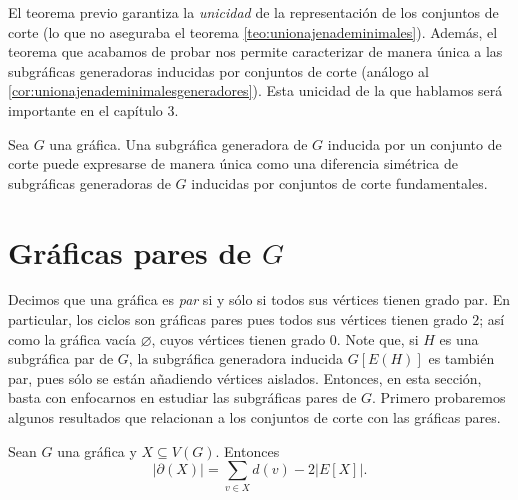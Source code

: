 El teorema previo garantiza la \textit{unicidad} de la representación de los conjuntos de corte (lo que no aseguraba el teorema \ref{teo:unionajenademinimales}). Además, el teorema que acabamos de probar nos permite caracterizar de manera única a las subgráficas generadoras inducidas por conjuntos de corte (análogo al \ref{cor:unionajenademinimalesgeneradores}). Esta unicidad de la que hablamos será importante en el capítulo 3.
\vspace{1 cm}
\begin{cor}\label{cor:DifSimUnicaDeFundamentales}
Sea $G$ una gráfica. Una subgráfica generadora de $G$ inducida por un conjunto de corte puede expresarse de manera única como una diferencia simétrica de subgráficas generadoras de $G$ inducidas por conjuntos de corte fundamentales.
\end{cor}






\section{Gráficas pares de $G$}
Decimos que una gráfica es \textit{par}  si y sólo si todos sus vértices tienen grado par. En particular, los ciclos son gráficas pares pues todos sus vértices tienen grado $2$; así como la gráfica vacía $\varnothing$, cuyos vértices tienen grado $0$. Note que, si $H$ es una subgráfica par de $G$, la subgráfica generadora inducida $G[E(H)]$ es también par, pues sólo se están añadiendo vértices aislados. Entonces, en esta sección, basta con enfocarnos en estudiar las subgráficas pares de $G$. Primero probaremos algunos resultados que relacionan a los conjuntos de corte con las gráficas pares.  

\begin{lema} \label{lema1}
Sean $G$ una gráfica y $X \subseteq V(G)$. Entonces
$$
\big|\partial(X)\big|= \sum _{v \in X} d(v)- 2 \big |E[X]\big |.
$$
\end{lema}

